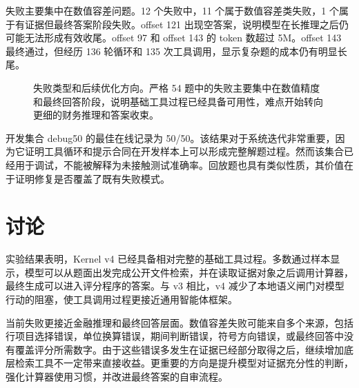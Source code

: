 \documentclass[12pt,a4paper,UTF8]{ctexart}
\begin{document}
失败主要集中在数值容差问题。12 个失败中，11 个属于数值容差类失败，1 个属于有证据但最终答案阶段失败。offset 121 出现空答案，说明模型在长推理之后仍可能无法形成有效收尾。offset 97 和 offset 143 的 token 数超过 5M。offset 143 最终通过，但经历 136 轮循环和 135 次工具调用，显示复杂题的成本仍有明显长尾。

\begin{figure}[H]
\centering
{}
\caption{失败类型和后续优化方向。严格 54 题中的失败主要集中在数值精度和最终回答阶段，说明基础工具过程已经具备可用性，难点开始转向更细的财务推理和答案收束。}
\label{fig:failure-cost}
\end{figure}

开发集合 debug50 的最佳在线记录为 50/50。该结果对于系统迭代非常重要，因为它证明工具循环和提示合同在开发样本上可以形成完整解题过程。然而该集合已经用于调试，不能被解释为未接触测试准确率。回放题也具有类似性质，其价值在于证明修复是否覆盖了既有失败模式。

\section{讨论}

实验结果表明，Kernel v4 已经具备相对完整的基础工具过程。多数通过样本显示，模型可以从题面出发完成公开文件检索，并在读取证据对象之后调用计算器，最终生成可以进入评分程序的答案。与 v3 相比，v4 减少了本地语义闸门对模型行动的阻塞，使工具调用过程更接近通用智能体框架。

当前失败更接近金融推理和最终回答层面。数值容差失败可能来自多个来源，包括行项目选择错误，单位换算错误，期间判断错误，符号方向错误，或最终回答中没有覆盖评分所需数字。由于这些错误多发生在证据已经部分取得之后，继续增加底层检索工具不一定带来直接收益。更重要的方向是提升模型对证据充分性的判断，强化计算器使用习惯，并改进最终答案的自审流程。
\end{document}
